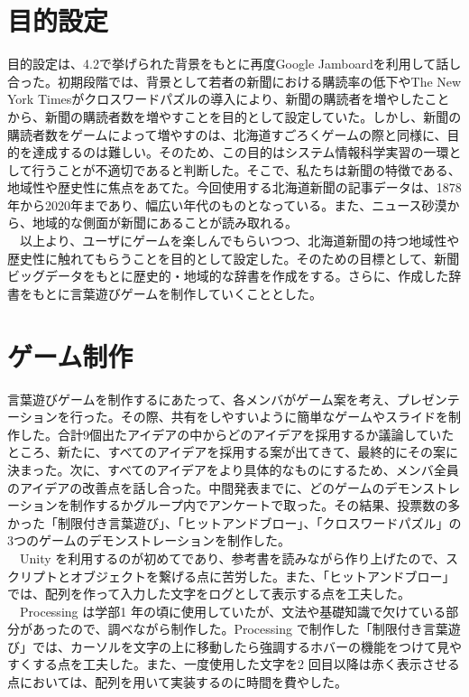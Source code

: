 \section{目的設定}
目的設定は、4.2で挙げられた背景をもとに再度Google Jamboardを利用して話し合った。初期段階では、背景として若者の新聞における購読率の低下やThe New York Timesがクロスワードパズルの導入により、新聞の購読者を増やしたことから、新聞の購読者数を増やすことを目的として設定していた。しかし、新聞の購読者数をゲームによって増やすのは、北海道すごろくゲームの際と同様に、目的を達成するのは難しい。そのため、この目的はシステム情報科学実習の一環として行うことが不適切であると判断した。そこで、私たちは新聞の特徴である、地域性や歴史性に焦点をあてた。今回使用する北海道新聞の記事データは、1878年から2020年まであり、幅広い年代のものとなっている。また、ニュース砂漠から、地域的な側面が新聞にあることが読み取れる。\\
　以上より、ユーザにゲームを楽しんでもらいつつ、北海道新聞の持つ地域性や歴史性に触れてもらうことを目的として設定した。そのための目標として、新聞ビッグデータをもとに歴史的・地域的な辞書を作成をする。さらに、作成した辞書をもとに言葉遊びゲームを制作していくこととした。

\newpage
\section{ゲーム制作}
言葉遊びゲームを制作するにあたって、各メンバがゲーム案を考え、プレゼンテーションを行った。その際、共有をしやすいように簡単なゲームやスライドを制作した。合計9個出たアイデアの中からどのアイデアを採用するか議論していたところ、新たに、すべてのアイデアを採用する案が出てきて、最終的にその案に決まった。次に、すべてのアイデアをより具体的なものにするため、メンバ全員のアイデアの改善点を話し合った。中間発表までに、どのゲームのデモンストレーションを制作するかグループ内でアンケートで取った。その結果、投票数の多かった「制限付き言葉遊び」、「ヒットアンドブロー」、「クロスワードパズル」の3つのゲームのデモンストレーションを制作した。\\
　Unity を利用するのが初めてであり、参考書を読みながら作り上げたので、スクリプトとオブジェクトを繋げる点に苦労した。また、「ヒットアンドブロー」では、配列を作って入力した文字をログとして表示する点を工夫した。\\
　Processing は学部1 年の頃に使用していたが、文法や基礎知識で欠けている部分があったので、調べながら制作した。Processing で制作した「制限付き言葉遊び」では、カーソルを文字の上に移動したら強調するホバーの機能をつけて見やすくする点を工夫した。また、一度使用した文字を2 回目以降は赤く表示させる点においては、配列を用いて実装するのに時間を費やした。

